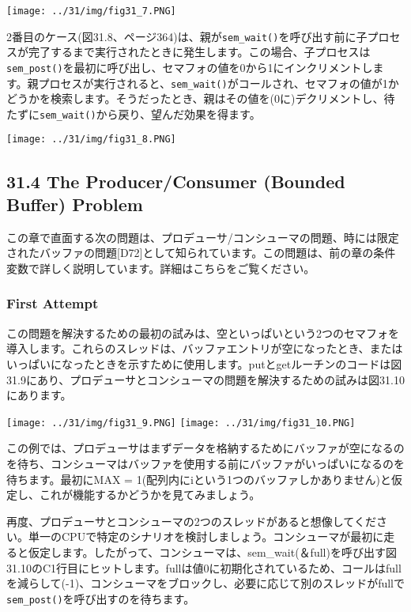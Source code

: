 \texttt{[image: ../31/img/fig31\_7.PNG]}

2番目のケース(図31.8、ページ364)は、親が\texttt{sem\_wait()}を呼び出す前に子プロセスが完了するまで実行されたときに発生します。この場合、子プロセスは\texttt{sem\_post()}を最初に呼び出し、セマフォの値を0から1にインクリメントします。親プロセスが実行されると、\texttt{sem\_wait()}がコールされ、セマフォの値が1かどうかを検索します。そうだったとき、親はその値を(0に)デクリメントし、待たずに\texttt{sem\_wait()}から戻り、望んだ効果を得ます。

\texttt{[image: ../31/img/fig31\_8.PNG]}

\hypertarget{the-producerconsumer-bounded-buffer-problem-1}{%
\subsection*{31.4 The Producer/Consumer (Bounded Buffer)
Problem}\label{the-producerconsumer-bounded-buffer-problem-1}}

この章で直面する次の問題は、プロデューサ/コンシューマの問題、時には限定されたバッファの問題{[}D72{]}として知られています。この問題は、前の章の条件変数で詳しく説明しています。詳細はこちらをご覧ください。

\hypertarget{first-attempt}{%
\subsubsection*{First Attempt}\label{first-attempt}}

この問題を解決するための最初の試みは、空といっぱいという2つのセマフォを導入します。これらのスレッドは、バッファエントリが空になったとき、またはいっぱいになったときを示すために使用します。putとgetルーチンのコードは図31.9にあり、プロデューサとコンシューマの問題を解決するための試みは図31.10にあります。

\texttt{[image: ../31/img/fig31\_9.PNG]}
\texttt{[image: ../31/img/fig31\_10.PNG]}

この例では、プロデューサはまずデータを格納するためにバッファが空になるのを待ち、コンシューマはバッファを使用する前にバッファがいっぱいになるのを待ちます。最初にMAX
=
1(配列内にiという1つのバッファしかありません)と仮定し、これが機能するかどうかを見てみましょう。

再度、プロデューサとコンシューマの2つのスレッドがあると想像してください。単一のCPUで特定のシナリオを検討しましょう。コンシューマが最初に走ると仮定します。したがって、コンシューマは、sem\_wait(＆full)を呼び出す図31.10のC1行目にヒットします。fullは値0に初期化されているため、コールはfullを減らして(-1)、コンシューマをブロックし、必要に応じて別のスレッドがfullで\texttt{sem\_post()}を呼び出すのを待ちます。

